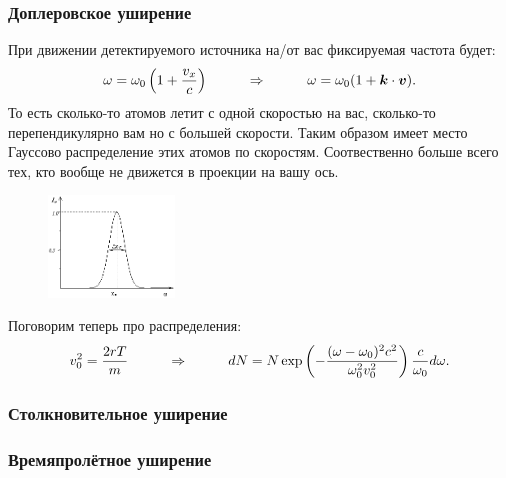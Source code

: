\subsubsection*{Доплеровское уширение}
При движении детектируемого источника на/от вас фиксируемая частота будет:
\begin{equation*}
	\omega = \omega_0 \left(1 + \frac{v_x}{c}\right)
	\hspace{1 cm}
	\Rightarrow
	\hspace{1 cm}
	\omega = \omega_0 (1 + \mbox{\boldmath $k$} \cdot \mbox{\boldmath $v$}).
\end{equation*}
То есть сколько-то атомов летит с одной скоростью на вас, сколько-то перепендикулярно вам но с большей скорости. Таким образом имеет место Гауссово распределение этих атомов по скоростям. Соотвественно больше всего тех, кто вообще не движется в проекции на вашу ось.
\begin{figure}[h]
    \centering
    \includegraphics[width=0.3\textwidth]{img/ushir.jpg}
\end{figure}


Поговорим теперь про распределения:
\begin{equation*}
	v_0^2 = \frac{2 r T }{m}
	\hspace{1 cm}
	\Rightarrow
	\hspace{1 cm}
	d N =  N \exp\left( - \frac{(\omega - \omega_0)^2 c^2}{\omega_0^2 v_0^2}\right)\frac{c}{\omega_0} d \omega.
\end{equation*}

\subsubsection*{Столкновительное уширение}
\subsubsection*{Времяпролётное уширение}

